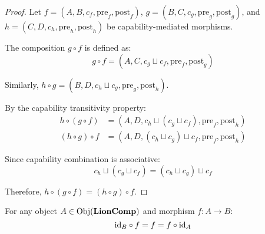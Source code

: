 \begin{proof}
Let $f = (A, B, c_f, \text{pre}_f, \text{post}_f)$, $g = (B, C, c_g, \text{pre}_g, \text{post}_g)$, and $h = (C, D, c_h, \text{pre}_h, \text{post}_h)$ be capability-mediated morphisms.

The composition $g \circ f$ is defined as:
\begin{equation}
g \circ f = (A, C, c_g \sqcup c_f, \text{pre}_f, \text{post}_g)
\end{equation}

Similarly, $h \circ g = (B, D, c_h \sqcup c_g, \text{pre}_g, \text{post}_h)$.

By the capability transitivity property:
\begin{align}
h \circ (g \circ f) &= (A, D, c_h \sqcup (c_g \sqcup c_f), \text{pre}_f, \text{post}_h) \\
(h \circ g) \circ f &= (A, D, (c_h \sqcup c_g) \sqcup c_f, \text{pre}_f, \text{post}_h)
\end{align}

Since capability combination is associative:
\begin{equation}
c_h \sqcup (c_g \sqcup c_f) = (c_h \sqcup c_g) \sqcup c_f
\end{equation}

Therefore, $h \circ (g \circ f) = (h \circ g) \circ f$.
\end{proof}

\begin{theorem}
\label{thm:identity}
For any object $A \in \mathrm{Obj}(\mathbf{LionComp})$ and morphism $f: A \to B$:
\begin{equation}
\mathrm{id}_B \circ f = f = f \circ \mathrm{id}_A
\end{equation}
\end{theorem}


